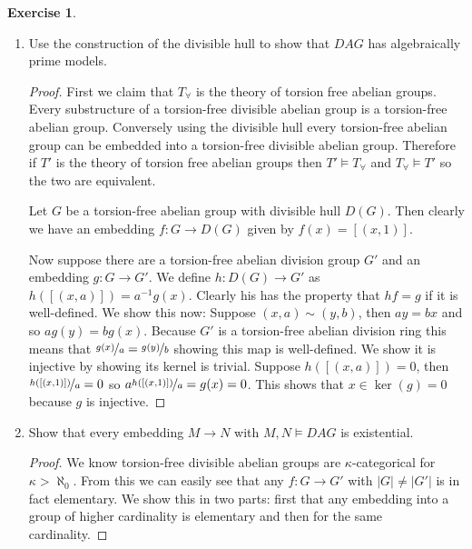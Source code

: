 \documentclass{article}
\theoremstyle{definition}
\newtheorem{question}{Exercise}
\begin{document}
\begin{question}
\begin{enumerate}[(1)]
        \item Use the construction of the divisible hull to show that \(DAG\)
              has algebraically prime models.

              \begin{proof}
                  First we claim that \(T_{\forall}\) is the theory of torsion
                  free abelian groups. Every substructure of a torsion-free
                  divisible abelian group is a torsion-free abelian group.
                  Conversely using the divisible hull every torsion-free abelian
                  group can be embedded into a torsion-free divisible abelian
                  group. Therefore if \(T'\) is the theory of torsion free
                  abelian groups then \(T'\models T_{\forall}\) and
                  \(T_{\forall}\models T'\) so the two are equivalent.

                  Let \(G\) be a torsion-free abelian group with divisible hull
                  \(D(G)\). Then clearly we have an embedding \(f:G\to D(G)\)
                  given by \(f(x)=[(x,1)]\).

                  Now suppose there are a torsion-free abelian division group
                  \(G'\) and an embedding \(g:G\to G'\). We define \(h:D(G)\to
                  G'\) as \(h([(x,a)])=a^{-1}g(x)\). Clearly his has the
                  property that \(hf=g\) if it is well-defined. We show this
                  now: Suppose \((x,a)\sim (y,b)\), then \(ay=bx\) and so
                  \(ag(y)=bg(x)\). Because \(G'\) is a torsion-free abelian
                  division ring this means that
                  \(\nicefrac{g(x)}{a}=\nicefrac{g(y)}{b}\) showing this map is
                  well-defined. We show it is injective by showing its kernel is
                  trivial. Suppose \(h([(x,a)])=0\), then
                  \(\nicefrac{h([(x,1)])}{a}=0\) so
                  \(a\nicefrac{h([(x,1)])}{a}=g(x)=0\). This shows that
                  \(x\in\ker(g)=0\) because \(g\) is injective.
              \end{proof}

        \item Show that every embedding \(M\to N\) with \(M,N\models DAG\) is
              existential.

              \begin{proof}
                  We know torsion-free divisible abelian groups are
                  \(\kappa\)-categorical for \(\kappa>\aleph_{0}\). From this we
                  can easily see that any \(f:G\to G'\) with \(|G|\neq|G'|\) is
                  in fact elementary. We show this in two parts: first that any
                  embedding into a group of higher cardinality is elementary and
                  then for the same cardinality.


\end{proof}
\end{enumerate}
\end{question}
\end{document}
